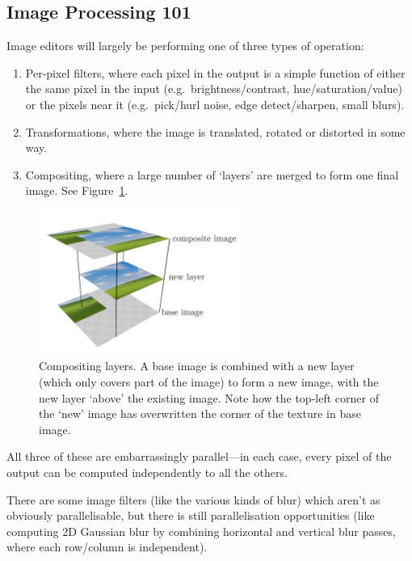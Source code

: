 \documentclass[12pt]{article}
\begin{document}
\subsection{Image Processing 101}

Image editors will largely be performing one of three types of operation:

\begin{enumerate}
    \item Per-pixel filters, where each pixel in the output is a simple function of either the same
        pixel in the input (e.g.\ brightness/contrast, hue/saturation/value) or the pixels near it
        (e.g.\ pick/hurl noise, edge detect/sharpen, small blurs).
    \item Transformations, where the image is translated, rotated or distorted in some way.
    \item Compositing, where a large number of `layers' are merged to form one final image.  See
        Figure~\ref{fig:compositing}.
\end{enumerate}

\begin{figure}
    \begin{center}
        \includegraphics[width=0.6\textwidth]{compositing}
    \end{center}
    \caption{Compositing layers.  A base image is combined with a new layer (which only covers part
    of the image) to form a new image, with the new layer `above' the existing image.  Note how the
    top-left corner of the `new' image has overwritten the corner of the texture in base
    image.}\label{fig:compositing}
\end{figure}

All three of these are embarrassingly parallel---in each case, every pixel of the output can be
computed independently to all the others.

There are some image filters (like the various kinds of blur) which aren't as obviously
parallelisable, but there is still parallelisation opportunities (like computing 2D Gaussian blur by
combining horizontal and vertical blur passes, where each row/column is independent).
\end{document}
